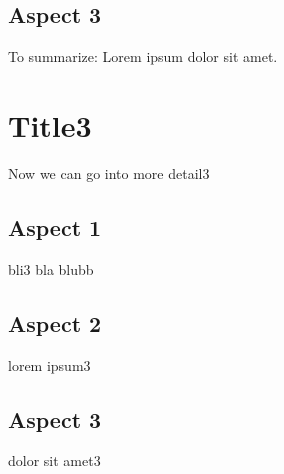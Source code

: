 \subsection{Aspect 3}
To summarize: Lorem ipsum dolor sit amet.

\section{Title3}
Now we can go into more detail3

\subsection{Aspect 1}
bli3
bla
blubb

\subsection{Aspect 2}
lorem ipsum3

\subsection{Aspect 3}
dolor sit amet3


